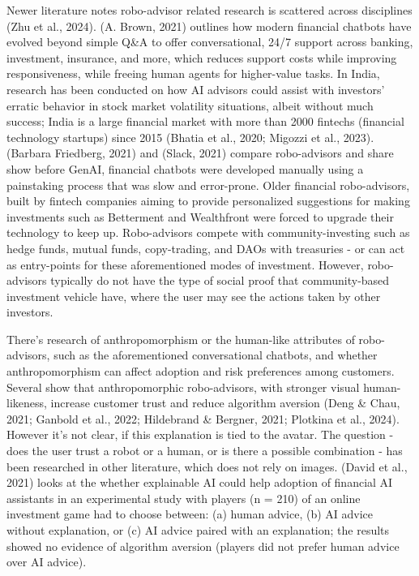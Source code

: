 \documentclass[
  letterpaper,
  DIV=11,
  numbers=noendperiod]{scrartcl}
\begin{document}
Newer literature notes robo-advisor related research is scattered across
disciplines (Zhu et al., 2024). (A. Brown, 2021) outlines how modern
financial chatbots have evolved beyond simple Q\&A to offer
conversational, 24/7 support across banking, investment, insurance, and
more, which reduces support costs while improving responsiveness, while
freeing human agents for higher-value tasks. In India, research has been
conducted on how AI advisors could assist with investors' erratic
behavior in stock market volatility situations, albeit without much
success; India is a large financial market with more than 2000 fintechs
(financial technology startups) since 2015 (Bhatia et al., 2020; Migozzi
et al., 2023). (Barbara Friedberg, 2021) and (Slack, 2021) compare
robo-advisors and share show before GenAI, financial chatbots were
developed manually using a painstaking process that was slow and
error-prone. Older financial robo-advisors, built by fintech companies
aiming to provide personalized suggestions for making investments such
as Betterment and Wealthfront were forced to upgrade their technology to
keep up. Robo-advisors compete with community-investing such as hedge
funds, mutual funds, copy-trading, and DAOs with treasuries - or can act
as entry-points for these aforementioned modes of investment. However,
robo-advisors typically do not have the type of social proof that
community-based investment vehicle have, where the user may see the
actions taken by other investors.

There's research of anthropomorphism or the human-like attributes of
robo-advisors, such as the aforementioned conversational chatbots, and
whether anthropomorphism can affect adoption and risk preferences among
customers. Several show that anthropomorphic robo-advisors, with
stronger visual human-likeness, increase customer trust and reduce
algorithm aversion (Deng \& Chau, 2021; Ganbold et al., 2022; Hildebrand
\& Bergner, 2021; Plotkina et al., 2024). However it's not clear, if
this explanation is tied to the avatar. The question - does the user
trust a robot or a human, or is there a possible combination - has been
researched in other literature, which does not rely on images. (David et
al., 2021) looks at the whether explainable AI could help adoption of
financial AI assistants in an experimental study with players (n = 210)
of an online investment game had to choose between: (a) human advice,
(b) AI advice without explanation, or (c) AI advice paired with an
explanation; the results showed no evidence of algorithm aversion
(players did not prefer human advice over AI advice).
\end{document}
